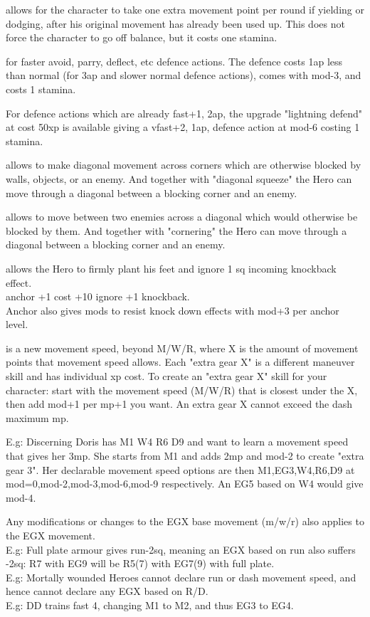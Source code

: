  allows for the character to take one extra movement point per round if yielding or dodging, after his original movement has already been used up. This does not force the character to go off balance, but it costs one stamina.


 for faster avoid, parry, deflect, etc defence actions. The defence costs 1ap less than normal (for 3ap and slower normal defence actions), comes with mod-3, and costs 1 stamina.

For defence actions which are already fast+1, 2ap, the upgrade "lightning defend" at cost 50xp is available giving a vfast+2, 1ap, defence action at mod-6 costing 1 stamina.


 allows to make diagonal movement across corners which are otherwise blocked by walls, objects, or an enemy. And together with "diagonal squeeze" the Hero can move through a diagonal between a blocking corner and an enemy.


 allows to move between two enemies across a diagonal which would otherwise be blocked by them. And together with "cornering" the Hero can move through a diagonal between a blocking corner and an enemy.


 allows the Hero to firmly plant his feet and ignore 1 sq incoming knockback effect.\\
anchor +1 cost +10 ignore +1 knockback.\\
Anchor also gives mods to resist knock down effects with mod+3 per anchor level.


 is a new movement speed, beyond M/W/R, where X is the amount of movement points that movement speed allows. Each "extra gear X" is a different maneuver skill and has individual xp cost. To create an "extra gear X" skill for your character: start with the movement speed (M/W/R) that is closest under the X, then add mod+1 per mp+1 you want. An extra gear X cannot exceed the dash maximum mp.

E.g: Discerning Doris has M1 W4 R6 D9 and want to learn a movement speed that gives her 3mp. She starts from M1 and adds 2mp and mod-2 to create "extra gear 3". Her declarable movement speed options are then M1,EG3,W4,R6,D9 at mod=0,mod-2,mod-3,mod-6,mod-9 respectively. An EG5 based on W4 would give mod-4.

Any modifications or changes to the EGX base movement (m/w/r) also applies to the EGX movement. \\
E.g: Full plate armour gives run-2sq, meaning an EGX based on run also suffers -2sq: R7 with EG9 will be R5(7) with EG7(9) with full plate. \\
E.g: Mortally wounded Heroes cannot declare run or dash movement speed, and hence cannot declare any EGX based on R/D.\\
E.g: DD trains fast 4, changing M1 to M2, and thus EG3 to EG4.


